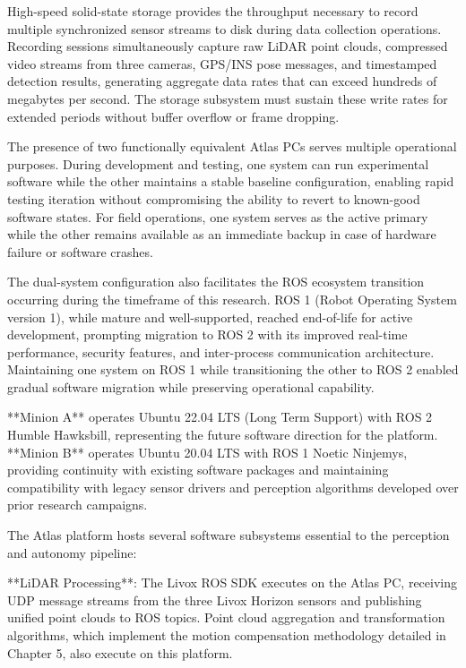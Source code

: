 \documentclass{erauthesis}
\begin{document}
High-speed solid-state storage provides the throughput necessary to record multiple synchronized sensor streams to disk during data collection operations. Recording sessions simultaneously capture raw LiDAR point clouds, compressed video streams from three cameras, GPS/INS pose messages, and timestamped detection results, generating aggregate data rates that can exceed hundreds of megabytes per second. The storage subsystem must sustain these write rates for extended periods without buffer overflow or frame dropping.

The presence of two functionally equivalent Atlas PCs serves multiple operational purposes. During development and testing, one system can run experimental software while the other maintains a stable baseline configuration, enabling rapid testing iteration without compromising the ability to revert to known-good software states. For field operations, one system serves as the active primary while the other remains available as an immediate backup in case of hardware failure or software crashes.

The dual-system configuration also facilitates the ROS ecosystem transition occurring during the timeframe of this research. ROS 1 (Robot Operating System version 1), while mature and well-supported, reached end-of-life for active development, prompting migration to ROS 2 with its improved real-time performance, security features, and inter-process communication architecture. Maintaining one system on ROS 1 while transitioning the other to ROS 2 enabled gradual software migration while preserving operational capability.

**Minion A** operates Ubuntu 22.04 LTS (Long Term Support) with ROS 2 Humble Hawksbill, representing the future software direction for the platform. **Minion B** operates Ubuntu 20.04 LTS with ROS 1 Noetic Ninjemys, providing continuity with existing software packages and maintaining compatibility with legacy sensor drivers and perception algorithms developed over prior research campaigns.

The Atlas platform hosts several software subsystems essential to the perception and autonomy pipeline:

**LiDAR Processing**: The Livox ROS SDK executes on the Atlas PC, receiving UDP message streams from the three Livox Horizon sensors and publishing unified point clouds to ROS topics. Point cloud aggregation and transformation algorithms, which implement the motion compensation methodology detailed in Chapter 5, also execute on this platform.
\end{document}
